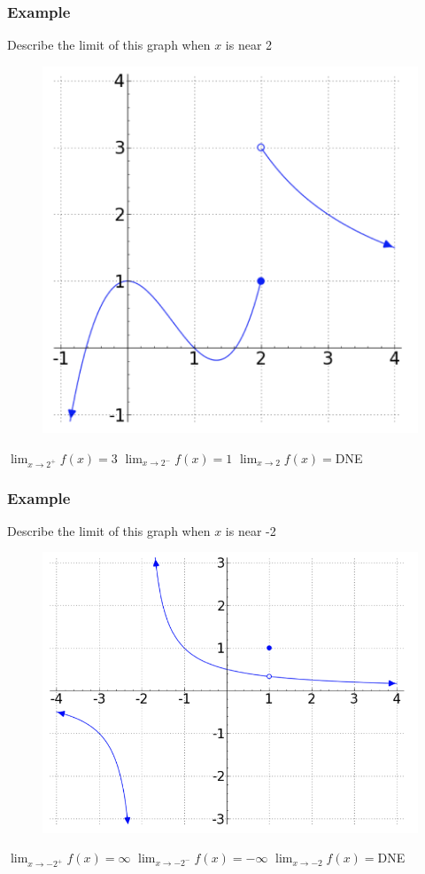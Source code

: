 \documentclass[t]{beamer}
\theoremstyle{plain}
\theoremstyle{definition}
\newcommand{\limm}[1]{\displaystyle \lim_{x\to #1}}
\begin{document}
\frame
{
	\frametitle{Example}
	Describe the limit of this graph when $x$ is near 2
	
	\begin{figure}[l]
	\includegraphics[scale=.3]{fig/limit0}
	\label{fig}
	\end{figure}	
	
    $\limm{2^+}f(x)=3$ \hspace{2em}
	$\limm{2^-}f(x)=1$  \hspace{2em}
	$\limm{2}f(x)=$DNE
}

\frame
{
	\frametitle{Example}
	Describe the limit of this graph when $x$ is near -2
	
	\begin{figure}[l]
	\includegraphics[scale=.2]{fig/limit1}
	\label{fig}
	\end{figure}	
	
    $\limm{-2^+}f(x)=\infty$ \hspace{2em}
	$\limm{-2^-}f(x)=-\infty$  \hspace{2em}
	$\limm{-2}f(x)=$DNE
}
\end{document}
